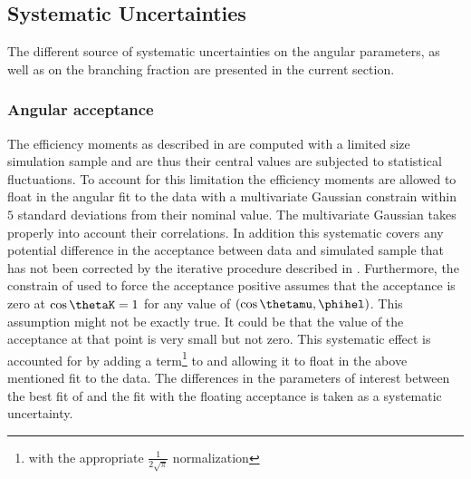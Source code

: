 \subsection{Systematic Uncertainties}
\label{systemics}
The different source of systematic uncertainties on the \Bs angular parameters, as well as on the branching fraction
are presented in the current section.

\subsubsection{Angular acceptance}
\label{systAngAcc}
The efficiency moments as described in  are computed with a limited size simulation sample
and are thus their central values are subjected to statistical fluctuations. To account for this limitation the
efficiency moments are allowed to float in the angular fit to the data with a multivariate Gaussian constrain within $5$
standard deviations from their nominal value. The multivariate Gaussian takes properly into account their correlations.
In addition this systematic covers any potential difference in the acceptance between data and simulated sample
that has not been corrected by the iterative procedure described in . Furthermore,
the constrain of  used to force the acceptance positive assumes that the acceptance is zero
at $\cos\thetaK=1$ for any value of $(\cos\thetamu,\phihel)$. This assumption might not be exactly true. It could be
that the value of the acceptance at that point is very small but not zero. This systematic effect is accounted for
by adding a term\footnote{with the appropriate $\frac{1}{2\sqrt{\pi}}$ normalization} to  and allowing it to
float in the above mentioned fit to the data. The differences in the parameters of interest between the best fit
of  and the fit with the floating acceptance is taken as a systematic uncertainty.


